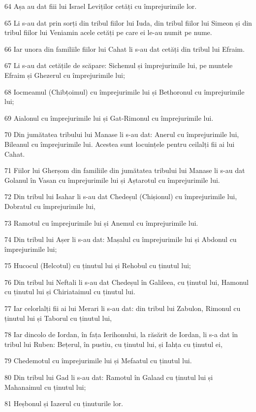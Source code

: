 \par 64 Așa au dat fiii lui Israel Leviților cetăți cu împrejurimile lor.
\par 65 Li s-au dat prin sorți din tribul fiilor lui Iuda, din tribul fiilor lui Simeon și din tribul fiilor lui Veniamin acele cetăți pe care ei le-au numit pe nume.
\par 66 Iar unora din familiile fiilor lui Cahat li s-au dat cetăți din tribul lui Efraim.
\par 67 Li s-au dat cetățile de scăpare: Sichemul și împrejurimile lui, pe muntele Efraim și Ghezerul cu împrejurimile lui;
\par 68 Iocmeamul (Chibțoimul) cu împrejurimile lui și Bethoronul cu împrejurimile lui;
\par 69 Aialonul cu împrejurimile lui și Gat-Rimonul cu împrejurimile lui.
\par 70 Din jumătatea tribului lui Manase li s-au dat: Anerul cu împrejurimile lui, Bileanul cu împrejurimile lui. Acestea sunt locuințele pentru ceilalți fii ai lui Cahat.
\par 71 Fiilor lui Gherșom din familiile din jumătatea tribului lui Manase li s-au dat Golanul în Vasan cu împrejurimile lui și Aștarotul cu împrejurimile lui.
\par 72 Din tribul lui Isahar li s-au dat Chedeșul (Chișionul) cu împrejurimile lui, Dobratul cu împrejurimile lui,
\par 73 Ramotul cu împrejurimile lui și Anemul cu împrejurimile lui.
\par 74 Din tribul lui Așer li s-au dat: Mașalul cu împrejurimile lui și Abdonul cu împrejurimile lui;
\par 75 Hucocul (Helcotul) cu ținutul lui și Rehobul cu ținutul lui;
\par 76 Din tribul lui Neftali li s-au dat Chedeșul în Galileea, cu ținutul lui, Hamonul cu ținutul lui și Chiriataimul cu ținutul lui.
\par 77 Iar celorlalți fii ai lui Merari li s-au dat: din tribul lui Zabulon, Rimonul cu ținutul lui și Taborul cu ținutul lui,
\par 78 Iar dincolo de Iordan, în fața Ierihonului, la răsărit de Iordan, li s-a dat în tribul lui Ruben: Bețerul, în pustiu, cu ținutul lui, și Iahța cu ținutul ei,
\par 79 Chedemotul cu împrejurimile lui și Mefaatul cu ținutul lui.
\par 80 Din tribul lui Gad li s-au dat: Ramotul în Galaad cu ținutul lui și Mahanaimul cu ținutul lui;
\par 81 Heșbonul și Iazerul cu ținuturile lor.

